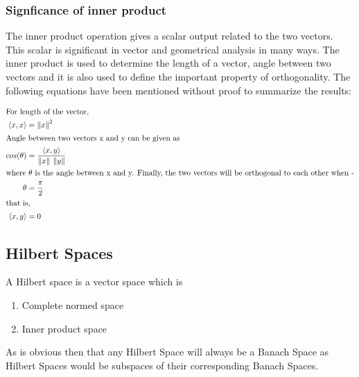 \documentclass[a4paper,12pt]{article}
\newcommand\norm[1]{\left\lVert#1\right\rVert}
\begin{document}
		\subsubsection{Signficance of inner product}
			The inner product operation gives a scalar output related to the two vectors. This scalar is significant in vector and geometrical analysis in many ways. The inner product is used to determine the length of a vector, angle between two vectors and it is also used to define the important property of orthogonality. The following equations have been mentioned without proof to summarize the results:
			
			\begin{align}
				\intertext{For length of the vector,}
				\left\langle x, x \right\rangle &= \norm{x}^{2} \\
				\intertext{Angle between two vectors x and y can be given as}
				cos(\theta)&= \frac{\left\langle x, y \right\rangle}{\norm{x} \: \norm{y}} \\
				\intertext{where $\theta$ is the angle between x and y. Finally, the two vectors will be orthogonal to each other when -}
				\theta &= \frac{\pi}{2} \\
				\intertext{that is, }
				\left\langle x, y \right\rangle &= 0 
			\end{align}
			
	\subsection{Hilbert Spaces}
	A Hilbert space is a vector space which is
		\begin{enumerate}
			\item Complete normed space
			\item Inner product space
		\end{enumerate}
	As is obvious then that any Hilbert Space will always be a Banach Space as Hilbert Spaces would be subspaces of their corresponding Banach Spaces.
\end{document}

